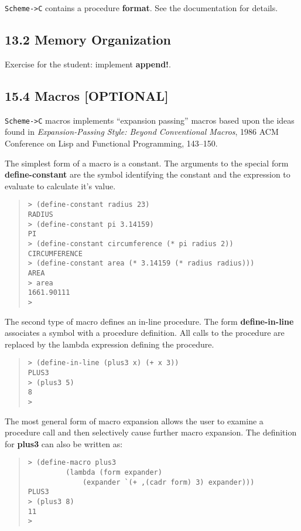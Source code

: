 \documentclass[10pt]{article}
\begin{document}
\texttt{Scheme->C} contains a procedure \textbf{format}.  See the documentation for
details.

\subsection*{13.2 Memory Organization}

Exercise for the student:  implement \textbf{append!}.

\subsection*{15.4 Macros [OPTIONAL]}

\texttt{Scheme->C} macros implements ``expansion passing'' macros based upon the
ideas found in \emph{Expansion-Passing Style: Beyond Conventional Macros},
1986 ACM Conference on Lisp and Functional Programming, 143--150.

The simplest form of a macro is a constant.  The arguments to the
special form \textbf{define-constant} are the symbol identifying the
constant and the expression to evaluate to calculate it's value.

\begin{quote}
\begin{verbatim}
> (define-constant radius 23)
RADIUS
> (define-constant pi 3.14159)
PI
> (define-constant circumference (* pi radius 2))
CIRCUMFERENCE
> (define-constant area (* 3.14159 (* radius radius)))
AREA
> area
1661.90111
>
\end{verbatim}
\end{quote}

The second type of macro defines an in-line procedure.  The form
\textbf{define-in-line} associates a symbol with a procedure definition.
All calls to the procedure are replaced by the lambda expression
defining the procedure.

\begin{quote}
\begin{verbatim}
> (define-in-line (plus3 x) (+ x 3))
PLUS3
> (plus3 5)
8
>
\end{verbatim}
\end{quote}

The most general form of macro expansion allows the user to
examine a procedure call and then selectively cause further
macro expansion.  The definition for \textbf{plus3} can also be written
as:

\begin{quote}
\begin{verbatim}
> (define-macro plus3
	     (lambda (form expander)
		     (expander `(+ ,(cadr form) 3) expander)))
PLUS3
> (plus3 8)
11
>				
\end{verbatim}
\end{quote}
\end{document}
